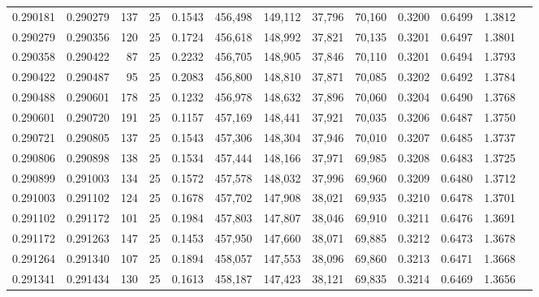 \begin{tabular}{rrrrrrrrrrrrr}
0.290181 & 0.290279 &   137 &  25 &                                     0.1543 & 456,498 & 149,112 &  37,796 &  70,160 & 0.3200 & 0.6499 & 1.3812 \\
0.290279 & 0.290356 &   120 &  25 &                                     0.1724 & 456,618 & 148,992 &  37,821 &  70,135 & 0.3201 & 0.6497 & 1.3801 \\
0.290358 & 0.290422 &    87 &  25 &                                     0.2232 & 456,705 & 148,905 &  37,846 &  70,110 & 0.3201 & 0.6494 & 1.3793 \\
0.290422 & 0.290487 &    95 &  25 &                                     0.2083 & 456,800 & 148,810 &  37,871 &  70,085 & 0.3202 & 0.6492 & 1.3784 \\
0.290488 & 0.290601 &   178 &  25 &                                     0.1232 & 456,978 & 148,632 &  37,896 &  70,060 & 0.3204 & 0.6490 & 1.3768 \\
0.290601 & 0.290720 &   191 &  25 &                                     0.1157 & 457,169 & 148,441 &  37,921 &  70,035 & 0.3206 & 0.6487 & 1.3750 \\
0.290721 & 0.290805 &   137 &  25 &                                     0.1543 & 457,306 & 148,304 &  37,946 &  70,010 & 0.3207 & 0.6485 & 1.3737 \\
0.290806 & 0.290898 &   138 &  25 &                                     0.1534 & 457,444 & 148,166 &  37,971 &  69,985 & 0.3208 & 0.6483 & 1.3725 \\
0.290899 & 0.291003 &   134 &  25 &                                     0.1572 & 457,578 & 148,032 &  37,996 &  69,960 & 0.3209 & 0.6480 & 1.3712 \\
0.291003 & 0.291102 &   124 &  25 &                                     0.1678 & 457,702 & 147,908 &  38,021 &  69,935 & 0.3210 & 0.6478 & 1.3701 \\
0.291102 & 0.291172 &   101 &  25 &                                     0.1984 & 457,803 & 147,807 &  38,046 &  69,910 & 0.3211 & 0.6476 & 1.3691 \\
0.291172 & 0.291263 &   147 &  25 &                                     0.1453 & 457,950 & 147,660 &  38,071 &  69,885 & 0.3212 & 0.6473 & 1.3678 \\
0.291264 & 0.291340 &   107 &  25 &                                     0.1894 & 458,057 & 147,553 &  38,096 &  69,860 & 0.3213 & 0.6471 & 1.3668 \\
0.291341 & 0.291434 &   130 &  25 &                                     0.1613 & 458,187 & 147,423 &  38,121 &  69,835 & 0.3214 & 0.6469 & 1.3656 \\

\end{tabular}
